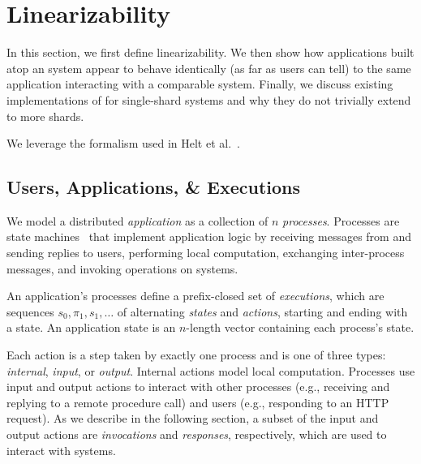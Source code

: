 \section{\Multidispatch{} Linearizability}
\label{sec:mdl}

In this section, we first define \multidispatch{} linearizability.
We then show how applications built atop an \MDL{} system appear
to behave identically (as far as users can tell) to the same application interacting
with a comparable \SDL{} system. Finally, we discuss existing implementations
of \MDL{} for single-shard systems and why they do not trivially extend to more
shards.

We leverage the formalism used in Helt et al.~\cite{helt2021rss}.

\subsection{Users, Applications, \& Executions}
\label{sec:mdl:applications}

We model a distributed \textit{application} as a collection of $n$
\textit{processes}. Processes are state machines~\cite{lynch1987ioa,lynch1996da}
that implement application logic by receiving messages from and sending replies
to users, performing local computation, exchanging inter-process messages, and
invoking operations on systems.

An application's processes define a prefix-closed set of \textit{executions},
which are sequences $s_0,\pi_1,s_1,\ldots$ of alternating \textit{states} and
\textit{actions}, starting and ending with a state. An application state
is an $n$-length vector containing each process's state.


Each action is a step taken by exactly one process and is one of three types:
\textit{internal}, \textit{input}, or \textit{output}. Internal actions model
local computation. Processes use input and output actions to interact with other
processes (e.g., receiving and replying to a remote procedure call) and
users (e.g., responding to an HTTP request). As we describe in the
following section, a subset of the input and output actions are
\textit{invocations} and \textit{responses}, respectively, which are used to
interact with systems.

